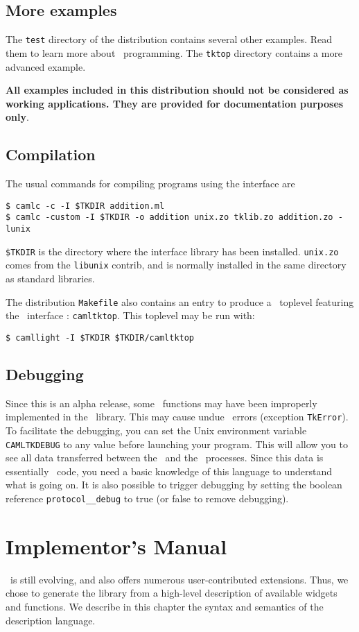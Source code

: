 \section{More examples}
The \verb|test| directory of the distribution contains several other
examples. Read them to learn more about \caml\tk\ programming.
The \verb|tktop| directory contains a more advanced example. 

{\bf All examples included in this distribution  should not be considered as
working applications. They are provided for documentation purposes only}.

\section{Compilation}
The usual commands for compiling programs using the \caml\tk interface are
\begin{verbatim}
$ camlc -c -I $TKDIR addition.ml
$ camlc -custom -I $TKDIR -o addition unix.zo tklib.zo addition.zo -lunix
\end{verbatim} 
\verb|$TKDIR| is the directory where the interface library has been
installed. \verb|unix.zo| comes from the \verb|libunix| contrib, and is
normally installed in the same directory as standard \caml libraries.

The distribution \verb|Makefile| also contains an entry to produce a \caml\
toplevel featuring the \tk\ interface : \verb|camltktop|.
This toplevel may be run with: 
\begin{verbatim}
$ camllight -I $TKDIR $TKDIR/camltktop
\end{verbatim} 

\section{Debugging}
Since this is an alpha release, some \tk\ functions may have been improperly
implemented in the \caml\ library. This may cause undue \tk\ errors
(exception \verb|TkError|). To facilitate the debugging, you can set the
Unix environment variable \verb|CAMLTKDEBUG| to any value before launching
your program. This will allow you to see all
data transferred between the \caml\ and the \tk\ processes. Since this data is
essentially \tcl\tk\ code, you need a basic knowledge of this language to
understand what is going on.
It is also possible to trigger debugging by setting the boolean reference
\verb|protocol__debug| to true (or false to remove debugging).


\chapter{Implementor's Manual}
\label{chap:impl}
\tk\ is still evolving, and also offers numerous user-contributed
extensions. Thus, we chose to generate the library from a high-level
description of available widgets and functions. 
We describe in this chapter
the syntax and semantics of the description language.

